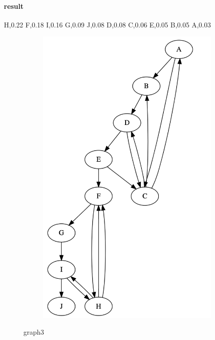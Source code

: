 \documentclass{article}
\begin{document}
    \paragraph{result}

H,0.22
F,0.18
I,0.16
G,0.09
J,0.08
D,0.08
C,0.06
E,0.05
B,0.05
A,0.03
      \newpage

\begin{figure}[h!]
  \centering
  \begin{subfigure}[b]{.6\linewidth}
    \includegraphics[width=\linewidth]{graph3.jpg}
  \end{subfigure}
  \caption{graph3 }

  \end{figure}
\end{document}
